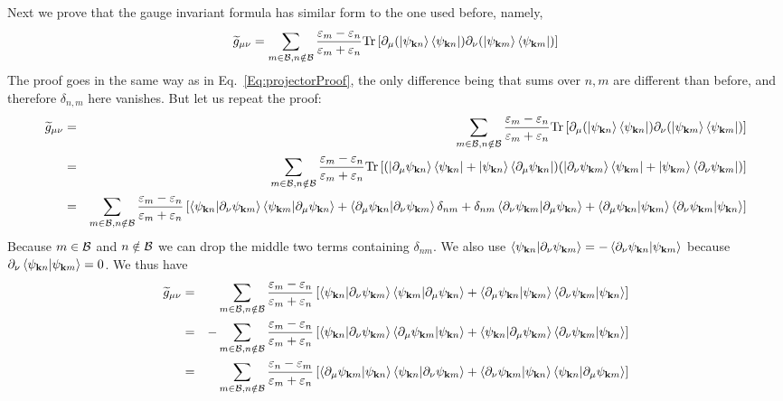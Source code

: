 \documentclass[onecolumn, prb,preprintnumbers,amsmath,amssymb,floatfix]{revtex4}
\newcommand{\vk}{{\mathbf{k}}}
\newcommand{\Tr}{\mathrm{Tr}} \newcommand{\npsi}{\underline{\psi}}
\newcommand{\cb}{{\cal B}}
\begin{document}
Next we prove that the gauge invariant formula has similar form to the
one used before, namely,
\begin{eqnarray}
\widetilde{g}_{\mu\nu}=  \sum_{m\in\cb,n\notin\cb}\frac{\varepsilon_m-\varepsilon_n}{\varepsilon_m+\varepsilon_n}
  \Tr\left[ \partial_\mu(\ket{\psi_{\vk n}}\bra{\psi_{\vk n}})  \partial_\nu (\ket{\psi_{\vk m}}\bra{\psi_{\vk m}})
  \right]
\end{eqnarray}  
The proof goes in the same way as in Eq.~\ref{Eq:projectorProof}, the
only difference being that sums over $n,m$ are different than before,
and therefore $\delta_{n,m}$ here vanishes.
But let us repeat the proof:
\begin{eqnarray}
  \widetilde{g}_{\mu\nu}&=&  \sum_{m\in\cb,n\notin\cb}
  \frac{\varepsilon_m-\varepsilon_n}{\varepsilon_m+\varepsilon_n}
  \Tr\left[ \partial_\mu(\ket{\psi_{\vk n}}\bra{\psi_{\vk n}})  \partial_\nu (\ket{\psi_{\vk m}}\bra{\psi_{\vk m}})
  \right]\\
&=&  \sum_{m\in\cb,n\notin\cb}
  \frac{\varepsilon_m-\varepsilon_n}{\varepsilon_m+\varepsilon_n}
  \Tr\left[
  (\ket{\partial_\mu\psi_{\vk n}}\bra{\psi_{\vk n}}+\ket{\psi_{\vk n}}\bra{\partial_\mu\psi_{\vk n}})
  (\ket{\partial_\nu \psi_{\vk m}}\bra{\psi_{\vk m}}+\ket{\psi_{\vk m}}\bra{\partial_\nu \psi_{\vk m}})
  \right]
  \nonumber\\
&=&  \sum_{m\in\cb,n\notin\cb}
  \frac{\varepsilon_m-\varepsilon_n}{\varepsilon_m+\varepsilon_n}
  \left[
   \braket{\psi_{\vk n}|\partial_\nu \psi_{\vk m}}\braket{\psi_{\vk m}|\partial_\mu\psi_{\vk n}}+
    \braket{\partial_\mu\psi_{\vk n}|\partial_\nu \psi_{\vk  m}}\delta_{n m}+
   \delta_{n m}\braket{\partial_\nu \psi_{\vk m}|\partial_\mu\psi_{\vk n}}+
   \braket{\partial_\mu\psi_{\vk n}|\psi_{\vk m}}\braket{\partial_\nu \psi_{\vk m}|\psi_{\vk n}}
  \right]
  \nonumber
\end{eqnarray}  
Because $m\in \cb$ and $n\notin\cb$ we can drop the middle two terms
containing $\delta_{nm}$. We also use $\braket{\psi_{\vk n}|\partial_\nu \psi_{\vk m}}=-\braket{\partial_\nu \psi_{\vk n}|\psi_{\vk m}}$
because $\partial_\nu \braket{\psi_{\vk n}|\psi_{\vk m}}=0$.
We thus have
\begin{eqnarray}
  \widetilde{g}_{\mu\nu}&=&  \sum_{m\in\cb,n\notin\cb}
  \frac{\varepsilon_m-\varepsilon_n}{\varepsilon_m+\varepsilon_n}
  \left[
   \braket{\psi_{\vk n}|\partial_\nu \psi_{\vk m}}\braket{\psi_{\vk m}|\partial_\mu\psi_{\vk n}}+
   \braket{\partial_\mu\psi_{\vk n}|\psi_{\vk m}}\braket{\partial_\nu \psi_{\vk m}|\psi_{\vk n}}
  \right]
\nonumber\\
&=&  -\sum_{m\in\cb,n\notin\cb}
  \frac{\varepsilon_m-\varepsilon_n}{\varepsilon_m+\varepsilon_n}
  \left[
   \braket{\psi_{\vk n}|\partial_\nu \psi_{\vk m}}\braket{\partial_\mu\psi_{\vk m}|\psi_{\vk n}}+
   \braket{\psi_{\vk n}|\partial_\mu\psi_{\vk m}}\braket{\partial_\nu \psi_{\vk m}|\psi_{\vk n}}
  \right]  
\nonumber\\
&=&  \sum_{m\in\cb,n\notin\cb}
  \frac{\varepsilon_n-\varepsilon_m}{\varepsilon_m+\varepsilon_n}
  \left[
   \braket{\partial_\mu\psi_{\vk m}|\psi_{\vk n}}\braket{\psi_{\vk n}|\partial_\nu \psi_{\vk m}}+
   \braket{\partial_\nu \psi_{\vk m}|\psi_{\vk n}}\braket{\psi_{\vk n}|\partial_\mu\psi_{\vk m}}
  \right]  
\end{eqnarray}  
\end{document}
